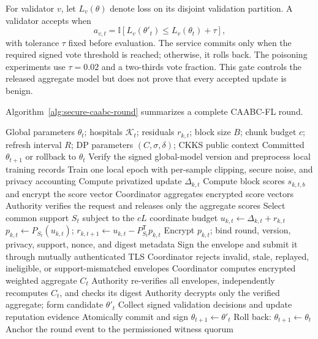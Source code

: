 For validator $v$, let $L_v(\theta)$ denote loss on its disjoint validation partition. A validator accepts when
\begin{equation}
    a_{v,t}=\mathbb{I}\!\left[L_v(\theta'_t)\leq L_v(\theta_t)+\tau\right],
    \label{eq:validation-gate}
\end{equation}
with tolerance $\tau$ fixed before evaluation. The service commits only when the required signed vote threshold is reached; otherwise, it rolls back. The poisoning experiments use $\tau=0.02$ and a two-thirds vote fraction. This gate controls the released aggregate model but does not prove that every accepted update is benign.

Algorithm~\ref{alg:secure-caabc-round} summarizes a complete CAABC-FL round.

\begin{algorithm}[htbp]
\caption{Authenticated and governed CAABC-FL round}
\label{alg:secure-caabc-round}
\begin{algorithmic}[1]
\Require Global parameters $\theta_t$; hospitals $\mathcal{K}_t$; residuals $r_{k,t}$; block size $B$; chunk budget $c$; refresh interval $R$; DP parameters $(C,\sigma,\delta)$; CKKS public context
\Ensure Committed $\theta_{t+1}$ or rollback to $\theta_t$
    \State Verify the signed global-model version and preprocess local training records
    \State Train one local epoch with per-sample clipping, secure noise, and privacy accounting
    \State Compute privatized update $\Delta_{k,t}$
        \State Compute block scores $s_{k,t,b}$ and encrypt the score vector
    \EndIf
\EndFor
{}
    \State Coordinator aggregates encrypted score vectors
    \State Authority verifies the request and releases only the aggregate scores
    \State Select common support $S_t$ subject to the $cL$ coordinate budget
\EndIf
{}
    \State $u_{k,t}\gets\Delta_{k,t}+r_{k,t}$
    \State $p_{k,t}\gets P_{S_t}(u_{k,t})$; $r_{k,t+1}\gets u_{k,t}-P_{S_t}^{\mathsf T}p_{k,t}$
    \State Encrypt $p_{k,t}$; bind round, version, privacy, support, nonce, and digest metadata
    \State Sign the envelope and submit it through mutually authenticated TLS
\EndFor
\State Coordinator rejects invalid, stale, replayed, ineligible, or support-mismatched envelopes
\State Coordinator computes encrypted weighted aggregate $C_t$
\State Authority re-verifies all envelopes, independently recomputes $C_t$, and checks its digest
\State Authority decrypts only the verified aggregate; form candidate $\theta'_t$
\State Collect signed validation decisions and update reputation evidence
    \State Atomically commit and sign $\theta_{t+1}\gets\theta'_t$
\Else
    \State Roll back: $\theta_{t+1}\gets\theta_t$
\EndIf
\State Anchor the round event to the permissioned witness quorum
\end{algorithmic}
\end{algorithm}

